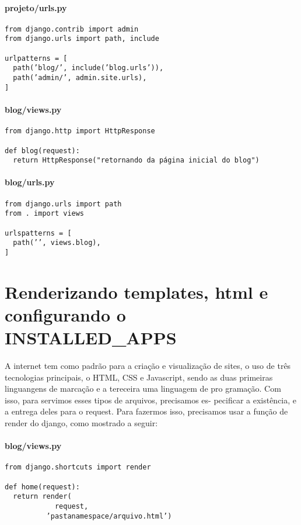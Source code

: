 \documentclass[12pt, a4paper]{paper}
\begin{document}
\paragraph{projeto/urls.py} %
\label{par:projeto/urls.py}
\begin{verbatim}
from django.contrib import admin
from django.urls import path, include

urlpatterns = [
  path(’blog/’, include(’blog.urls’)),
  path(’admin/’, admin.site.urls),
]
\end{verbatim}

\paragraph{blog/views.py} %
\label{par:blog/views.py}

\begin{verbatim}
from django.http import HttpResponse

def blog(request):
  return HttpResponse("retornando da página inicial do blog")
\end{verbatim}

\paragraph{blog/urls.py} %
\label{par:blog/urls.py}
\begin{verbatim}
from django.urls import path
from . import views

urlspatterns = [
  path(’’, views.blog),
]
\end{verbatim}


\section{Renderizando templates, html e configurando o INSTALLED\_APPS} %
\label{sec:Renderizando templates, html e configurando o INSTALLED\_APPS}
A internet tem como padrão para a criação e visualização de sites, o uso
de três tecnologias principais, o HTML, CSS e Javascript, sendo as duas
primeiras linguangens de marcação e a tereceira uma linguagem de pro
gramação. Com isso, para servimos esses tipos de arquivos, precisamos es-
pecificar a existência, e a entrega deles para o request. Para fazermos isso,
precisamos usar a função de render do django, como mostrado a seguir:


\paragraph{blog/views.py} %
\label{par:blog/views.py}
\begin{verbatim}
from django.shortcuts import render

def home(request):
  return render(
            request,
          ’pastanamespace/arquivo.html’)
\end{verbatim}
\end{document}
